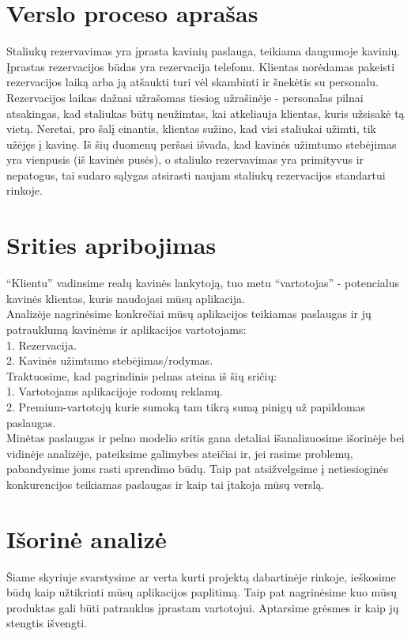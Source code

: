 \documentclass{VUMIFPSkursinis}
\begin{document}
\section{Verslo proceso aprašas}
Staliukų rezervavimas yra įprasta kavinių paslauga, teikiama daugumoje kavinių. Įprastas rezervacijos būdas yra rezervacija telefonu. Klientas norėdamas pakeisti rezervacijos laiką arba ją atšaukti turi vėl skambinti ir šnekėtis su personalu. Rezervacijos laikas dažnai užrašomas tiesiog užrašinėje - personalas pilnai atsakingas, kad staliukas būtų neužimtas, kai atkeliauja klientas, kuris užsisakė tą vietą. Neretai, pro šalį einantis, klientas sužino, kad visi staliukai užimti, tik užėjęs į kavinę. Iš šių duomenų peršasi išvada, kad kavinės užimtumo stebėjimas yra vienpusis (iš kavinės pusės), o staliuko rezervavimas yra primityvus ir nepatogus, tai sudaro sąlygas atsirasti naujam staliukų rezervacijos standartui rinkoje.\\

\section{Srities apribojimas}
“Klientu” vadinsime realų kavinės lankytoją, tuo metu “vartotojas” - potencialus kavinės klientas, kuris naudojasi mūsų aplikacija.\\
Analizėje nagrinėsime konkrečiai mūsų aplikacijos teikiamas paslaugas ir jų patrauklumą kavinėms ir aplikacijos vartotojams:\\
	1. Rezervacija.\\
	2. Kavinės užimtumo stebėjimas/rodymas.\\
Traktuosime, kad pagrindinis pelnas ateina iš šių sričių:\\
	1. Vartotojams aplikacijoje rodomų reklamų.\\
	2. Premium-vartotojų kurie sumoką tam tikrą sumą pinigų už papildomas paslaugas.\\
Minėtas paslaugas ir pelno modelio sritis gana detaliai išanalizuosime išorinėje bei vidinėje analizėje, pateiksime galimybes ateičiai ir, jei rasime problemų, pabandysime joms rasti sprendimo būdų. Taip pat atsižvelgsime į netiesioginės konkurencijos teikiamas paslaugas ir kaip tai įtakoja mūsų verslą.


\section{Išorinė analizė}
Šiame skyriuje svarstysime ar verta kurti projektą dabartinėje rinkoje, ieškosime būdų kaip užtikrinti mūsų aplikacijos paplitimą. Taip pat nagrinėsime kuo mūsų produktas gali būti patrauklus įprastam vartotojui. Aptarsime grėsmes ir kaip jų stengtis išvengti.
\end{document}
